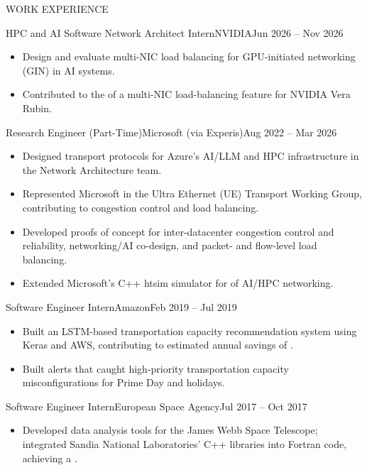 \documentclass{mcdowellcv}
\begin{document}
\begin{cvsection}{WORK EXPERIENCE}
    \begin{cvsubsection}{HPC and AI Software Network Architect Intern}{NVIDIA}{Jun 2026 -- Nov 2026}
        \begin{itemize}
            \item Design and evaluate multi-NIC load balancing for GPU-initiated networking (GIN) in AI systems.
            \item Contributed to the  of a multi-NIC load-balancing feature for NVIDIA Vera Rubin.
        \end{itemize}
    \end{cvsubsection}

    \begin{cvsubsection}{Research Engineer (Part-Time)}{Microsoft (via Experis)}{Aug 2022 -- Mar 2026}
        \begin{itemize}
            \item Designed transport protocols for Azure's AI/LLM and HPC infrastructure in the Network Architecture team.
            \item Represented Microsoft in the Ultra Ethernet (UE) Transport Working Group, contributing to congestion control and load balancing.
            \item Developed proofs of concept for inter-datacenter congestion control and reliability, networking/AI co-design, and packet- and flow-level load balancing.
            \item Extended Microsoft's C++ htsim simulator for  of AI/HPC networking.
        \end{itemize}
    \end{cvsubsection}

    \begin{cvsubsection}{Software Engineer Intern}{Amazon}{Feb 2019 -- Jul 2019}
        \begin{itemize}
            \item Built an LSTM-based transportation capacity recommendation system using Keras and AWS, contributing to estimated annual savings of .
            \item Built alerts that caught high-priority transportation capacity misconfigurations for Prime Day and holidays.
        \end{itemize}
    \end{cvsubsection}

    \begin{cvsubsection}{Software Engineer Intern}{European Space Agency}{Jul 2017 -- Oct 2017}
        \begin{itemize}
            \item Developed data analysis tools for the James Webb Space Telescope; integrated Sandia National Laboratories' C++ libraries into Fortran code, achieving a .
        \end{itemize}
    \end{cvsubsection}
\end{cvsection}
\end{document}
